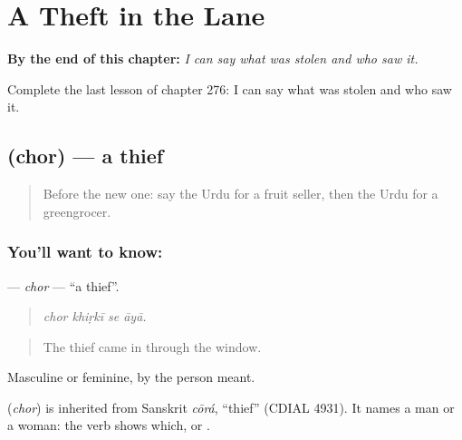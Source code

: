 
\chapter{A Theft in the Lane}
\label{ch:ur-a-theft-in-the-lane}

\begin{chapteropening}
\textbf{By the end of this chapter:} \emph{I can say what was stolen and who saw it.}

Complete the last lesson of chapter 276: I can say what was stolen and who saw it.
\end{chapteropening}

\section[\texorpdfstring{\ur{چور} (chor)}{چور (chor)}]{ (chor) — a thief}

\label{lesson:UR-C276-chor}



\begin{quote}
Before the new one: say the Urdu for a fruit seller, then the Urdu for a greengrocer.
\end{quote}

\subsection*{You'll want to know: }
\textbf{} — \emph{chor} — \textquotedblleft{}a thief\textquotedblright{}.

\begin{quote}
   
\end{quote}

\begin{quote}
\emph{chor khiṛkī se āyā.}
\end{quote}

\begin{quote}
The thief came in through the window.
\end{quote}

Masculine or feminine, by the person meant.

\begin{cousinweb}
\textbf{} (\emph{chor}) is inherited from Sanskrit \emph{cōrá}, \textquotedblleft{}thief\textquotedblright{} (CDIAL 4931). It names a man or a woman: the verb shows which, \textbf{ } or \textbf{ }.
\end{cousinweb}

